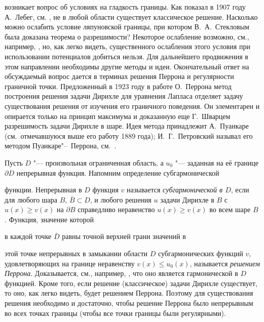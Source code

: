 возникает вопрос об условиях на гладкость границы. Как показал в 1907 году А.~Лебег, см. \cite{gushin:Leb}, не в любой области существует классическое решение. Насколько можно ослабить условие ляпуновской границы, при котором В.~А.~Стекловым была доказана теорема о разрешимости? Некоторое ослабление возможно, см., например, \cite{gushin:Gunt}, но, как легко видеть, существенного ослабления этого условия при использовании потенциалов добиться нельзя. Для дальнейшего продвижения в этом направлении необходимы другие методы и идеи. Окончательный ответ на обсуждаемый вопрос  дается в терминах решения Перрона и регулярности граничной точки. Предложенный в 1923 году в работе О.~Перрона \cite{gushin:Perr}  метод построения решения задачи Дирихле для уравнения Лапласа  отделяет задачу существования решения от изучения его граничного поведения. Он элементарен и опирается только на принцип максимума  и доказанную еще Г.~Шварцем разрешимость задачи Дирихле в шаре. Идея метода принадлежит А.~Пуанкаре (см.~отмечавшуюся выше его работу 1889 года); И.~Г.~Петровский называл его методом Пуанкаре"--~Перрона, см.~\cite{gushin:Petr}.



Пусть $D$ "--- произвольная ограниченная область, а $u_0$ "--- заданная на её границе $\partial D$ непрерывная функция. Напомним определение субгармонической

функции. Непрерывная в $D$ функция $v$ называется {\it субгармонической в $D$}, если для любого шара $B$, $\bar{B}\subset D$, и любого решения $u$ задачи Дирихле в $B$ с $ u(x) \geq v(x)$ на $\partial B$ справедливо неравенство $u(x) \geq v(x)$ во всем шаре $B$. Функция, значение которой

в каждой точке $\bar{D}$ равны точной верхней грани значений в

этой точке непрерывных в замыкании области $D$ субгармонических функций $v$, удовлетворяющих на границе неравенству $v(x) \leq u_0(x)$, называется {\it решением Перрона}. Доказывается, см., например, \cite{gushin:Petr}, что оно является гармонической в $D$ функцией. Кроме того, если решение (классическое) задачи Дирихле существует, то оно, как легко видеть, будет решением Перрона. Поэтому для существования решения необходимо и достаточно, чтобы решение Перрона было непрерывным во всех точках границы (чтобы все точки границы были регулярными).



